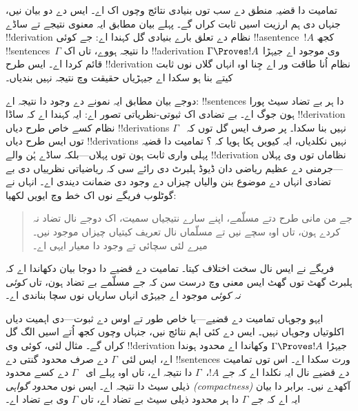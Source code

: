 \documentclass[../../../include/open-logic-section]{subfiles}
\begin{document}
      {}
      {}


تمامیت دا قضیہ منطق دے سب توں بنیادی نتائج وچوں اک اے۔ ایس دے
دو بیان نیں، جنہاں دی ہم ارزیت اسیں ثابت کراں گے۔ پہلے بیان
مطابق ایہ معنوی نتیجے تے ساڈے !!{derivation} نظام دے تعلق بارے
بنیادی گل کہندا اے: جے کوئی !!a{sentence}~$!A$ کجھ
!!{sentence}s~$\Gamma$ دا نتیجہ ہووے، تاں اک
!!a{derivation} وی موجود اے جیہڑا $\Gamma
\Proves !A$ قائم کردا اے۔ ایس طرح !!{derivation} نظام
اُنا طاقت ور اے جِنا اوہ انہاں گلاں نوں ثابت کیتے بنا ہو سکدا اے
جیہڑیاں حقیقت وچ نتیجہ نہیں بندیاں۔

دوجے بیان مطابق ایہ نمونے دے وجود دا نتیجہ اے: !!{sentence}s
دا ہر بے تضاد سیٹ پورا ہون جوگ اے۔ بے تضادی اک ثبوتی-نظریاتی
تصور اے: ایہ کہندا اے کہ ساڈا !!{derivation} نظام کسے خاص
طرح دیاں !!{derivation}s نہیں بنا سکدا۔ پر صرف ایس گل توں کہ
~$\Gamma$ توں ایس طرح دیاں !!{derivation}s نہیں نکلدیاں، ایہ
کیویں پکا ہویا کہ
؟
تمامیت دا قضیہ پہلی واری ثابت ہون توں پہلاں---بلکہ ساڈے ہُن
والے !!{derivation} نظاماں توں وی پہلاں---جرمنی دے عظیم ریاضی
دان ڈیوڈ ہلبرٹ دی رائے سی کہ ریاضیاتی نظرییاں دی بے تضادی
انہاں دے موضوع بنن والیاں چیزاں دے وجود دی ضمانت دیندی اے۔
انہاں نے گوٹلوب فریگے نوں اک خط وچ ایویں لکھیا:
\begin{quote}
  جے من مانی طرح دتے مسلّمے، اپنے سارے نتیجیاں سمیت، اک دوجے
  نال تضاد نہ کردے ہون، تاں اوہ سچے نیں تے مسلّماں نال تعریف
  کیتیاں چیزاں موجود نیں۔ میرے لئی سچائی تے وجود دا معیار ایہی اے۔
\end{quote}
فریگے نے ایس نال سخت اختلاف کیتا۔ تمامیت دے قضیے دا دوجا
بیان دکھاندا اے کہ ہلبرٹ گھٹ توں گھٹ ایس معنی وچ درست سن کہ
جے مسلّمے بے تضاد ہون، تاں \emph{کوئی نہ کوئی}
 موجود اے جیہڑی
انہاں ساریاں نوں سچا بناندی اے۔

ایہو وجوہاں تمامیت دے قضیے---یا خاص طور تے اوس دے ثبوت---دی
اہمیت دیاں اکلوتیاں وجوہاں نہیں۔ ایس دے کئی اہم نتائج نیں،
جنہاں وچوں کجھ اُتے اسیں الگ گل کراں گے۔ مثال لئی، کوئی وی
!!{derivation} جیہڑا $\Gamma \Proves !A$ وکھاندا اے محدود
ہوندا اے، ایس لئی~$\Gamma$ دے صرف محدود گنتی دے
!!{sentence}s ورت سکدا اے۔ اس توں تمامیت دے قضیے نال ایہ
نکلدا اے کہ جے $!A$،~$\Gamma$ دا نتیجہ اے، تاں اوہ پہلے ای
~$\Gamma$ دے کسے محدود ذیلی سیٹ دا نتیجہ اے۔ ایس نوں
\emph{محدود گواہی (compactness)} آکھدے نیں۔ برابر دا بیان
ایہ اے کہ جے $\Gamma$ دا ہر محدود ذیلی سیٹ بے تضاد اے، تاں
$\Gamma$ وی بے تضاد اے۔
\end{document}
